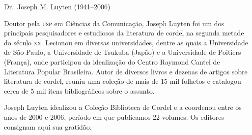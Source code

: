 \thispagestyle{empty}

\begin{flushright}\begin{minipage}{.8\textwidth}

Dr.~Joseph M. Luyten (1941--2006)\smallskip

\small
Doutor pela \textsc{usp} em Ciências da Comunicação, Joseph Luyten foi um dos principais 
pesquisadores e estudiosos da literatura de cordel na segunda metade do século
\textsc{xx}. Lecionou em diversas universidades, dentre as quais a Universidade
de São Paulo, a Universidade de Tsukuba (Japão) e a Universidade de Poitiers
(França), onde participou da idealização do Centro Raymond Cantel de Literatura
Popular Brasileira. Autor de diversos livros e dezenas de artigos sobre literatura de cordel, 
reuniu uma coleção de mais de 15 mil folhetos e catalogou cerca de 5 mil 
itens bibliográficos sobre o assunto.

Joseph Luyten idealizou a Coleção Biblioteca de Cordel e a 
coordenou entre os anos de 2000 e 2006, período em que publicamos 22 volumes. 
Os editores consignam aqui sua gratidão.
\end{minipage}\end{flushright}
\vfil

